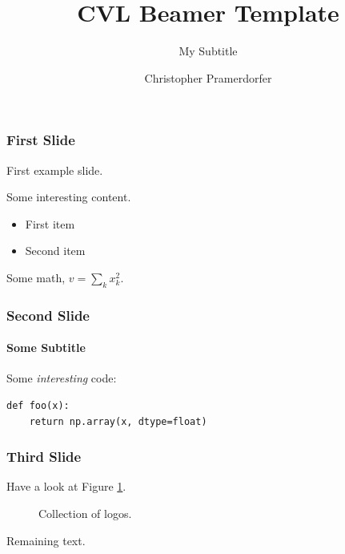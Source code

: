 \documentclass[xetex,professionalfont]{beamer}
\title{CVL Beamer Template}
\subtitle{My Subtitle}
\author{Christopher Pramerdorfer}
\institute{Computer Vision Lab, Vienna University of Technology}
\begin{document}

\begin{frame}
\maketitle
\end{frame}


\begin{frame}
\frametitle{First Slide}

First example slide.

Some interesting content.

\begin{itemize}
    \item First item
    \item Second item
\end{itemize}

Some math, $v=\sum_k x_k^2$.


\end{frame}

\begin{frame}[fragile]
\frametitle{Second Slide}
\framesubtitle{Some Subtitle}

Some \emph{interesting} code:

\begin{verbatim}
def foo(x):
    return np.array(x, dtype=float)
\end{verbatim}

\end{frame}


\begin{frame}
\frametitle{Third Slide}

Have a look at Figure \ref{fig:tuwcvl}.

\begin{figure}
\centering
{} 
\caption{Collection of logos.}
\label{fig:tuwcvl}
\end{figure}

Remaining text.

\end{frame}
\end{document}

